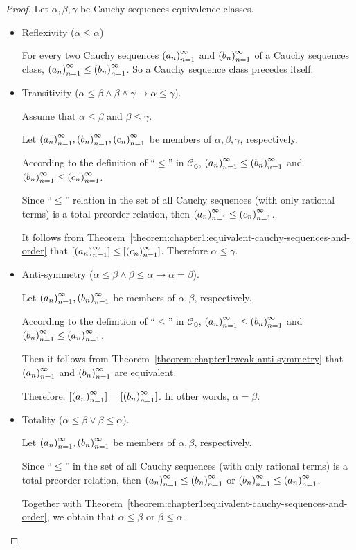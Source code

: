 \begin{proof}
    Let $\alpha, \beta, \gamma$ be Cauchy sequences equivalence classes.
    \begin{itemize}
        \item Reflexivity ($\alpha\le\alpha$)

              For every two Cauchy sequences ${\left({a_{n}}\right)}^{\infty}_{n=1}$ and ${\left({b_{n}}\right)}^{\infty}_{n=1}$ of a Cauchy sequences class, ${\left({a_{n}}\right)}^{\infty}_{n=1}\le{\left({b_{n}}\right)}^{\infty}_{n=1}$. So a Cauchy sequence class precedes itself.
        \item Transitivity ($\alpha\le\beta\land\beta\land\gamma\rightarrow\alpha\le\gamma$).

              Assume that $\alpha\le\beta$ and $\beta\le\gamma$.

              Let ${\left({a_{n}}\right)}^{\infty}_{n=1}, {\left({b_{n}}\right)}^{\infty}_{n=1}, {\left({c_{n}}\right)}^{\infty}_{n=1}$ be members of $\alpha, \beta, \gamma$, respectively.

              According to the definition of ``$\le$'' in $\mathscr{C}_{\mathbb{Q}}$, ${\left({a_{n}}\right)}^{\infty}_{n=1}\le{\left({b_{n}}\right)}^{\infty}_{n=1}$ and ${\left({b_{n}}\right)}^{\infty}_{n=1}\le{\left({c_{n}}\right)}^{\infty}_{n=1}$.

              Since ``$\le$'' relation in the set of all Cauchy sequences (with only rational terms) is a total preorder relation, then ${\left({a_{n}}\right)}^{\infty}_{n=1}\le{\left({c_{n}}\right)}^{\infty}_{n=1}$.

              It follows from Theorem~\ref{theorem:chapter1:equivalent-cauchy-sequences-and-order} that $\left[{{\left({a_{n}}\right)}^{\infty}_{n=1}}\right]\le\left[{{\left({c_{n}}\right)}^{\infty}_{n=1}}\right]$. Therefore $\alpha\le\gamma$.

        \item Anti-symmetry ($\alpha\le\beta\land\beta\le\alpha\rightarrow\alpha=\beta$).

              Let ${\left({a_{n}}\right)}^{\infty}_{n=1}, {\left({b_{n}}\right)}^{\infty}_{n=1}$ be members of $\alpha, \beta$, respectively.

              According to the definition of ``$\le$'' in $\mathscr{C}_{\mathbb{Q}}$, ${\left({a_{n}}\right)}^{\infty}_{n=1}\le{\left({b_{n}}\right)}^{\infty}_{n=1}$ and ${\left({b_{n}}\right)}^{\infty}_{n=1}\le{\left({a_{n}}\right)}^{\infty}_{n=1}$.

              Then it follows from Theorem~\ref{theorem:chapter1:weak-anti-symmetry} that ${\left({a_{n}}\right)}^{\infty}_{n=1}$ and ${\left({b_{n}}\right)}^{\infty}_{n=1}$ are equivalent.

              Therefore, $\left[{{\left({a_{n}}\right)}^{\infty}_{n=1}}\right] = \left[{{\left({b_{n}}\right)}^{\infty}_{n=1}}\right]$. In other words, $\alpha = \beta$.
        \item Totality ($\alpha\le\beta\vee\beta\le\alpha$).

              Let ${\left({a_{n}}\right)}^{\infty}_{n=1}, {\left({b_{n}}\right)}^{\infty}_{n=1}$ be members of $\alpha, \beta$, respectively.

              Since ``$\le$'' in the set of all Cauchy sequences (with only rational terms) is a total preorder relation, then ${\left({a_{n}}\right)}^{\infty}_{n=1}\le{\left({b_{n}}\right)}^{\infty}_{n=1}$ or ${\left({b_{n}}\right)}^{\infty}_{n=1}\le{\left({a_{n}}\right)}^{\infty}_{n=1}$.

              Together with Theorem~\ref{theorem:chapter1:equivalent-cauchy-sequences-and-order}, we obtain that $\alpha\le\beta$ or $\beta\le\alpha$.\qedhere
    \end{itemize}
\end{proof}

